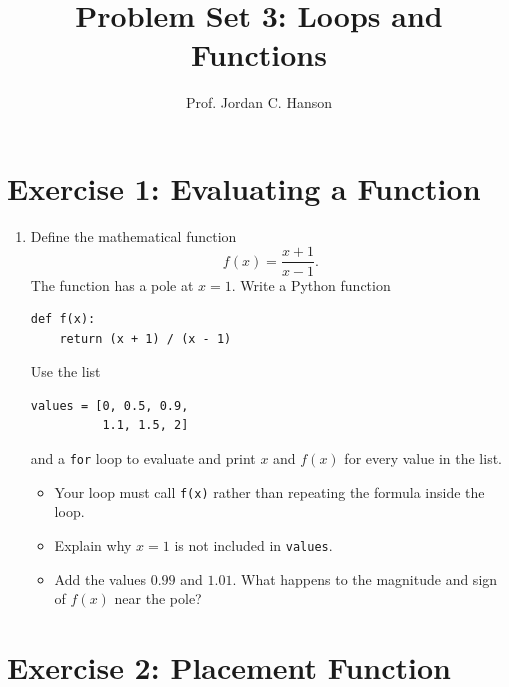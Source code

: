 \documentclass{article}
\begin{document}
\twocolumn

\title{Problem Set 3: Loops and Functions}
\author{Prof. Jordan C. Hanson}
\date{}
\maketitle

\section{Exercise 1: Evaluating a Function}

\begin{enumerate}
\item Define the mathematical function
\[
f(x)=\frac{x+1}{x-1}.
\]
The function has a pole at $x=1$.  Write a Python function

\begin{verbatim}
def f(x):
    return (x + 1) / (x - 1)
\end{verbatim}

Use the list

\begin{verbatim}
values = [0, 0.5, 0.9,
          1.1, 1.5, 2]
\end{verbatim}

and a \texttt{for} loop to evaluate and print $x$ and $f(x)$ for every value in the list.

\begin{itemize}
\item Your loop must call \texttt{f(x)} rather than repeating the formula inside the loop.
\item Explain why $x=1$ is not included in \texttt{values}.
\item Add the values $0.99$ and $1.01$.  What happens to the magnitude and sign of $f(x)$ near the pole?
\end{itemize}
\end{enumerate}

\section{Exercise 2: Placement Function}
\end{document}
